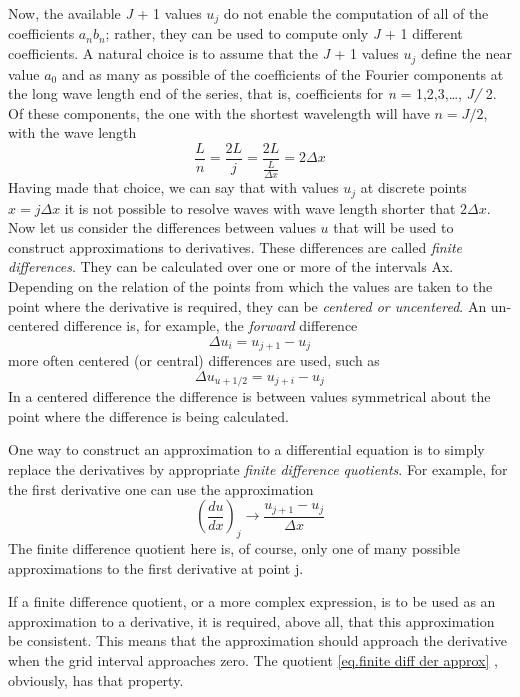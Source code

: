 Now, the available \textit{J} + 1 values $u_j$ do not enable the computation of all of the coefficients $a_nb_n$; rather, they can be used to compute only \textit{J} + 1 different coefficients. A natural choice is to assume that the \textit{J} + 1 values $u_j$ define the near value $a_0$ and as many as possible of the coefficients of the Fourier components at the long wave length end of the series, that is, coefficients for \textit{n} = 1,2,3,…, \textit{J/} 2. Of these components, the one with the shortest wavelength will have $n=J/2$, with the wave length 
 $$\frac{L}{n}=\frac{2L}{j}=\frac{2L}{\frac{L}{\Delta x}}=2\Delta x$$
 Having made that choice, we can say that with values $u_j$ at discrete points $x=j\Delta x$ it is not possible to resolve waves with wave length shorter that $2\Delta x$. 
 Now let us consider the differences between values $u$ that will be used to construct approximations to derivatives. These differences are called \textit{finite differences}. They can be calculated over one or more of the intervals Ax. Depending on the relation of the points from which the values are taken to the point where the derivative is required, they can be \textit{centered or uncentered}. An un-centered difference is, for example, the \textit{forward} difference 
 \begin{equation}\label{eq: forward difference}
     \Delta u_i=u_{j+1}-u_j
 \end{equation}
 more often centered (or central) differences are used, such as 
\begin{equation}
     \Delta u_{u+1/2}=u_{j+i}-u_j
 \end{equation}
In a centered difference the difference is between values symmetrical about the point where the difference is being calculated.

One way to construct an approximation to a differen­tial equation is to simply replace the derivatives by appro­priate \textit{finite difference quotients}. For example, for the first derivative one can use the approximation
\begin{equation}\label{eq.finite diff der approx}
    \left(\frac{du}{dx}\right)_j\rightarrow\frac{u_{j+1}-u_j}{\Delta x}
\end{equation}
The finite difference quotient here is, of course, only one of many possible approximations to the first derivative at point j.

If a finite difference quotient, or a more complex expression, is to be used as an approximation to a deri­vative, it is required, above all, that this approximation be consistent. This means that the approximation should approach the derivative when the grid interval approaches zero. The quotient \ref{eq.finite diff der approx} , obviously, has that property.

